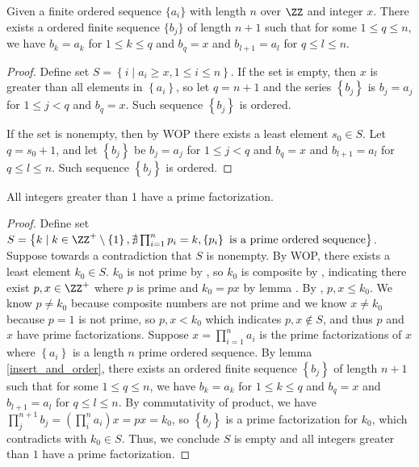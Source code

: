 \begin{lemma}\label{insert_and_order}
    Given a finite ordered sequence $\{a_i\}$ with length $n$ over $\ZZ$ and integer $x$. There exists a ordered finite sequence $\{b_j\}$ of length $n+1$ such that for some $1\leq q\leq n$, we have $b_k=a_k$ for $1\leq k\leq q$ and $b_q=x$ and $b_{l+1}=a_l$ for $q\leq l\leq n$.
\end{lemma}
\begin{proof}
    Define set $S=\left\{ i \mid a_i\geq x, 1\leq i\leq n\right\}$. If the set is empty, then $x$ is greater than all elements in $\left\{a_i\right\}$, so let $q=n+1$ and the series $\left\{b_j\right\}$ is $b_j=a_j$ for $1\leq j< q$ and $b_{q}=x$. Such sequence $\left\{b_j\right\}$ is ordered. 
    
    If the set is nonempty, then by WOP there exists a least element $s_0\in S$. Let $q=s_0+1$, and let $\left\{b_j\right\}$ be $b_j=a_j$ for $1\leq j<q$ and $b_q=x$ and $b_{l+1}=a_l$ for $q\leq l\leq n$. Such sequence $\left\{b_j\right\}$ is ordered.
\end{proof}

\begin{theorem}\label{prime_factorization_exist_all}
    All integers greater than 1 have a prime factorization.
\end{theorem}
\begin{proof}
    Define set $S=\left\{ k\mid k\in\ZZ^+\setminus\left\{1\right\}, \nexists\prod_{i=1}^n p_i=k, \left\{p_i\right\} \text{ is a prime ordered sequence}  \right\}$. Suppose towards a contradiction that $S$ is nonempty. By WOP, there exists a least element $k_0\in S$. $k_0$ is not prime by , so $k_0$ is composite by , indicating there exist $p,x\in\ZZ^+$ where $p$ is prime and $k_0=px$ by lemma . By , $p,x\leq k_0$. We know $p\neq k_0$ because composite numbers are not prime and we know $x\neq k_0$ because $p=1$ is not prime, so $p,x<k_0$ which indicates $p,x\notin S$, and thus $p$ and $x$ have prime factorizations. Suppose $x=\prod_{i=1}^n a_i$ is the prime factorizations of $x$ where $\left\{a_i\right\}$ is a length $n$ prime ordered sequence. By lemma \ref{insert_and_order}, there exists an ordered finite sequence $\left\{b_j\right\}$ of length $n+1$ such that for some $1\leq q\leq n$, we have $b_k=a_k$ for $1\leq k\leq q$ and $b_q=x$ and $b_{l+1}=a_l$ for $q\leq l\leq n$. By commutativity of product, we have $\prod_j^{n+1} b_j=(\prod_i^n a_i)x=px=k_0$, so $\left\{b_j\right\}$ is a prime factorization for $k_0$, which contradicts with $k_0\in S$. Thus, we conclude $S$ is empty and all integers greater than $1$ have a prime factorization.
\end{proof}

